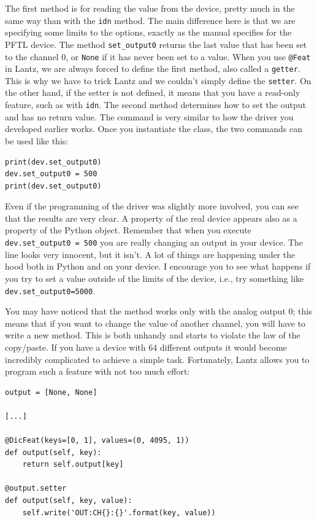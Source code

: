The first method is for reading the value from the device, pretty much
in the same way than with the \texttt{idn} method. The main difference
here is that we are specifying some limits to the options, exactly as
the manual specifies for the {PFTL} device. The method
\texttt{set_output0} returns the last value that has been set to the
channel 0, or \texttt{None} if it has never been set to a value. When
you use \texttt{@Feat} in Lantz, we are always forced to define the
first method, also called a \texttt{getter}. This is why we have to
trick Lantz and we couldn't simply define the \texttt{setter}. On the
other hand, if the setter is not defined, it means that you have a
read-only feature, such as with \texttt{idn}. The second method
determines how to set the output and has no return value. The command is
very similar to how the driver you developed earlier works. Once you
instantiate the class, the two commands can be used like this:

\begin{verbatim}
print(dev.set_output0)
dev.set_output0 = 500
print(dev.set_output0)
\end{verbatim}

Even if the programming of the driver was slightly more involved, you
can see that the results are very clear. A property of the real device
appears also as a property of the Python object. Remember that when you
execute \texttt{dev.set_output0 = 500} you are really changing an
output in your device. The line looks very innocent, but it isn't. A lot
of things are happening under the hood both in Python and on your
device. I encourage you to see what happens if you try to set a value
outside of the limits of the device, i.e., try something like
\texttt{dev.set_output0=5000}.

You may have noticed that the method works only with the analog output
0; this means that if you want to change the value of another channel,
you will have to write a new method. This is both unhandy and starts to
violate the law of the copy/paste. If you have a device with 64
different outputs it would become incredibly complicated to achieve a
simple task. Fortunately, Lantz allows you to program such a feature
with not too much effort:

\begin{verbatim}
output = [None, None]

[...]

@DicFeat(keys=[0, 1], values=(0, 4095, 1))
def output(self, key):
    return self.output[key]

@output.setter
def output(self, key, value):
    self.write('OUT:CH{}:{}'.format(key, value))
\end{verbatim}


